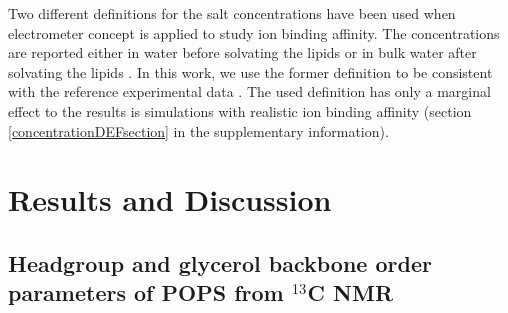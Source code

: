 \documentclass[aps,prl,superscriptaddress,twocolumn]{revtex4}
\begin{document}
Two different definitions for the salt concentrations have been used when
electrometer concept is applied to study ion binding affinity.
The concentrations are reported either in water before solvating the lipids \cite{akutsu81,roux90,catte16}
or in bulk water after solvating the lipids \cite{altenbach84,melcr18}.
In this work, we use the former definition to be consistent with the reference
experimental data \cite{roux90}. The used definition has only a marginal effect
to the results is simulations with realistic ion binding affinity
(section \ref{concentrationDEFsection} in the supplementary information).

\section{Results and Discussion}

\subsection{Headgroup and glycerol backbone order parameters of POPS from $^{13}$C NMR}
\end{document}
